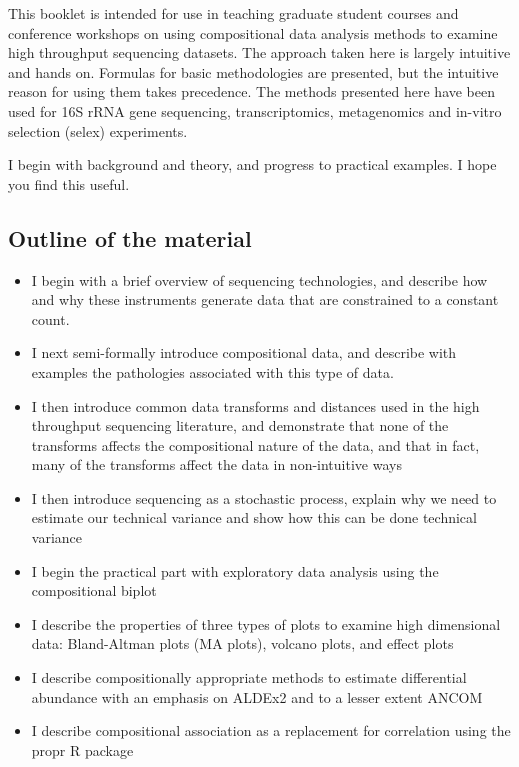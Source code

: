 \documentclass[twocolumn]{article}
\providecommand{\tightlist}{%
  \setlength{\itemsep}{0pt}\setlength{\parskip}{0pt}}
\begin{document}
This booklet is intended for use in teaching graduate student courses
and conference workshops on using compositional data analysis methods to
examine high throughput sequencing datasets. The approach taken here is
largely intuitive and hands on. Formulas for basic methodologies are
presented, but the intuitive reason for using them takes precedence. The
methods presented here have been used for 16S rRNA gene sequencing,
transcriptomics, metagenomics and in-vitro selection (selex)
experiments.

I begin with background and theory, and progress to practical examples.
I hope you find this useful.

\subsection{Outline of the material}\label{outline-of-the-material}

\begin{itemize}
\tightlist
\item
  I begin with a brief overview of sequencing technologies, and describe
  how and why these instruments generate data that are constrained to a
  constant count.
\item
  I next semi-formally introduce compositional data, and describe with
  examples the pathologies associated with this type of data.
\item
  I then introduce common data transforms and distances used in the high
  throughput sequencing literature, and demonstrate that none of the
  transforms affects the compositional nature of the data, and that in
  fact, many of the transforms affect the data in non-intuitive ways
\item
  I then introduce sequencing as a stochastic process, explain why we
  need to estimate our technical variance and show how this can be done
  technical variance
\item
  I begin the practical part with exploratory data analysis using the
  compositional biplot
\item
  I describe the properties of three types of plots to examine high
  dimensional data: Bland-Altman plots (MA plots), volcano plots, and
  effect plots
\item
  I describe compositionally appropriate methods to estimate
  differential abundance with an emphasis on ALDEx2 and to a lesser
  extent ANCOM
\item
  I describe compositional association as a replacement for correlation
  using the propr R package \clearpage
\end{itemize}
\end{document}
